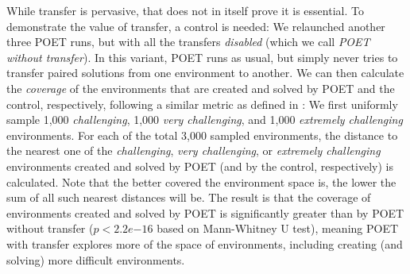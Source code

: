 \documentclass{article}
\newcommand{\jc}[1]{\comments{\textcolor{deepForestGreen}{[JC: #1]}}}
\newcommand{\ks}[1]{\comments{\textcolor{purple}{[Ken: #1]}}}
\newcommand{\comments}[1]{#1}
\begin{document}
While transfer is pervasive, that does not in itself prove it is essential. 
To demonstrate the value of transfer, a control is needed: We relaunched another three POET runs, but with all the transfers \emph{disabled} (which we call \emph{POET without transfer}). In this variant, POET runs as usual, but simply never
tries to transfer paired solutions from one environment to another.
We can then calculate the \emph{coverage} of the environments that are created and solved by POET and the control, respectively, following a similar metric as defined in \citet{lehman:gecco11}: We first uniformly sample 1,000 \emph{challenging}, 1,000 \emph{very challenging}, and 1,000 \emph{extremely challenging} environments. For each of the total 3,000 sampled environments, the distance to the nearest
one of the \emph{challenging}, \emph{very challenging}, or \emph{extremely challenging} environments created and solved by POET (and by the control, respectively) is calculated. Note that the better covered the environment space is, the lower the sum of all such nearest distances will be. The result is that the coverage of environments created and solved by POET is significantly greater than by POET without transfer ($p < 2.2e{-16}$ based on Mann-Whitney U test), meaning POET with transfer explores more of the space of environments, including creating (and solving) more difficult environments. 
\end{document}
